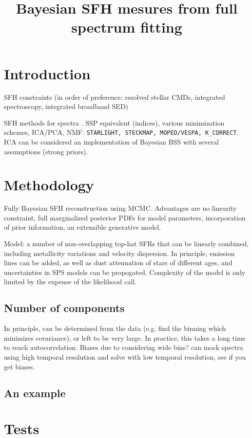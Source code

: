 \title{Bayesian SFH mesures from full spectrum fitting}


\section{Introduction}
\citet{tinsley68}

SFH constraints (in order of preference: resolved stellar CMDs, integrated spectroscopy, integrated broadband SED)

SFH methods for spectra \citep{walcher2011}.  SSP equivalent (indices), various minimization schemes, ICA/PCA, NMF. \texttt{STARLIGHT, STECKMAP, MOPED/VESPA, K_CORRECT}.  ICA can be considered an implementation of Bayesian BSS with several assumptions (strong priors).

\section{Methodology}
Fully Bayesian SFH reconstruction using MCMC.  Advantages are no linearity constraint, full marginalized posterior PDFs for model parameters, incorporation of prior information, an extensible generative model.

Model:  a number of non-overlapping top-hat SFRs that can be linearly combined, including metallicity variations and velocity dispersion.  In principle, emission lines can be added, as well as dust attenuation of stars of different ages, and uncertainties in SPS models can be propogated.  Complexity of the model is only limited by the expense of the likelihood call.

\subsection{Number of components}
In principle, can be determined from the data (e.g. find the binning which minimizes covariance), or left to be very large.  In practice, this takes a long time to reach autocorrelation. Biases due to considering wide bins?  can mock spectra using high temporal resolution and solve with low temporal resolution, see if you get biases.

\subsection{An example}

\section{Tests}


